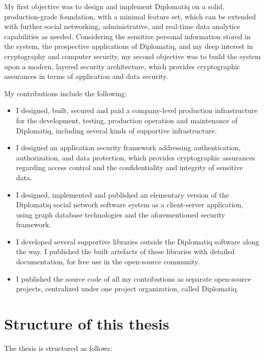 My first objective was to design and implement Diplomatiq on a solid, production-grade foundation, with a minimal feature set, which can be extended with further social networking, administrative, and real-time data analytics capabilities as needed. Considering the sensitive personal information stored in the system, the prospective applications of Diplomatiq, and my deep interest in cryptography and computer security, my second objective was to build the system upon a modern, layered security architecture, which provides cryptographic assurances in terms of application and data security.

My contributions include the following:

\begin{itemize}
\item I designed, built, secured and paid a company-level production infrastructure for the development, testing, production operation and maintenance of Diplomatiq, including several kinds of supportive infrastructure.
\item I designed an application security framework addressing authentication, authorization, and data protection, which provides cryptographic assurances regarding access control and the confidentiality and integrity of sensitive data.
\item I designed, implemented and published an elementary version of the Diplomatiq social network software system as a client-server application, using graph database technologies and the aforementioned security framework.
\item I developed several supportive libraries outside the Diplomatiq software along the way. I published the built artefacts of these libraries with detailed documentation, for free use in the open-source community.
\item I published the source code of all my contributions as separate open-source projects, centralized under one project organization, called Diplomatiq.
\end{itemize}

\section{Structure of this thesis}

The thesis is structured as follows:

